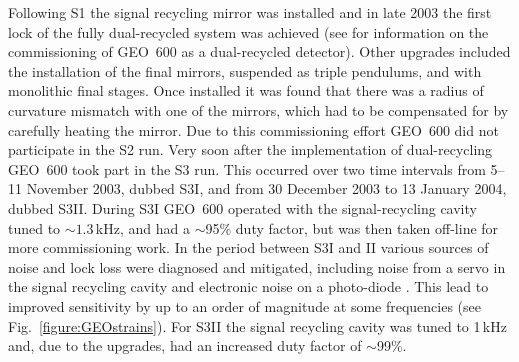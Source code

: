 \documentclass{article}
\begin{document}

Following S1 the signal recycling mirror was installed and in late 2003 the
first lock of the fully dual-recycled system was achieved (see
\cite{Smith:2004, Willke:2004, Grote:2005} for information on the commissioning
of GEO~600 as a dual-recycled detector). Other upgrades included the
installation of the final mirrors, suspended as triple pendulums, and with
monolithic final stages. Once installed it was found that there was a radius of
curvature mismatch with one of the mirrors, which had to be compensated for by
carefully heating the mirror. Due to this commissioning effort GEO~600 did not
participate in the S2 run. Very soon after the implementation of dual-recycling
GEO~600 took part in the S3 run. This occurred over two time intervals from
5--11 November 2003, dubbed S3I, and from 30 December 2003 to 13 January 2004,
dubbed S3II. During S3I GEO~600 operated with the signal-recycling cavity tuned
to $\sim 1.3$\,kHz, and had a $\sim$95\% duty factor, but was then taken
off-line for more commissioning work. In the period between S3I and II various
sources of noise and lock loss were diagnosed and mitigated, including noise
from a servo in the signal recycling cavity and electronic noise on a
photo-diode \cite{Smith:2004}. This lead to improved sensitivity by up to an
order of magnitude at some frequencies (see Fig.~\ref{figure:GEOstrains}). For
S3II the signal recycling cavity was tuned to 1\,kHz and, due to the upgrades,
had an increased duty factor of $\sim$99\%.
\end{document}
